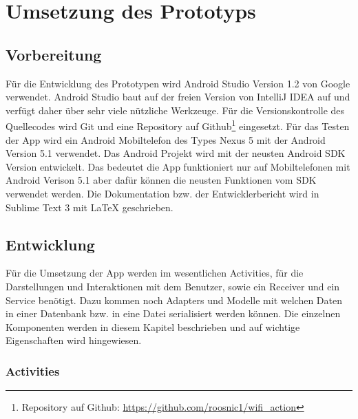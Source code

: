 \chapter{Umsetzung des Prototyps}
\label{sec:umsetzung}

\section{Vorbereitung}

Für die Entwicklung des Prototypen wird Android Studio Version 1.2 von Google verwendet. Android Studio baut auf der freien Version von IntelliJ IDEA auf und verfügt daher über sehr viele nützliche Werkzeuge. Für die Versionskontrolle des Quellecodes wird Git und eine Repository auf Github\footnote{Repository auf Github: \url{https://github.com/roosnic1/wifi_action}} eingesetzt. Für das Testen der App wird ein Android Mobiltelefon des Types Nexus 5 mit der Android Version 5.1 verwendet. Das Android Projekt wird mit der neusten Android SDK Version entwickelt. Das bedeutet die App funktioniert nur auf Mobiltelefonen mit Android Verison 5.1 aber dafür können die neusten Funktionen vom SDK verwendet werden. Die Dokumentation bzw. der Entwicklerbericht wird in Sublime Text 3 mit \LaTeX{} geschrieben.

\section{Entwicklung}
Für die Umsetzung der App werden im wesentlichen Activities, für die Darstellungen und Interaktionen mit dem Benutzer, sowie ein Receiver und ein Service benötigt. Dazu kommen noch Adapters und Modelle mit welchen Daten in einer Datenbank bzw. in eine Datei serialisiert werden können. Die einzelnen Komponenten werden in diesem Kapitel beschrieben und auf wichtige Eigenschaften wird hingewiesen.

\subsection{Activities}


